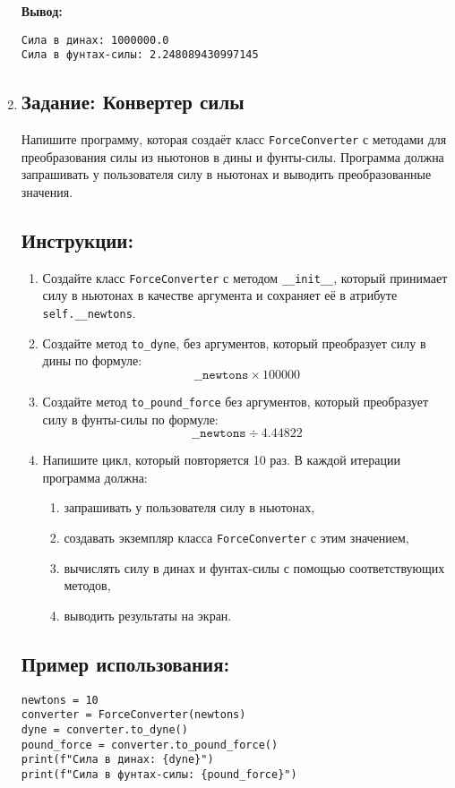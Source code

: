 \begin{enumerate}
\textbf{Вывод:}
\begin{verbatim}
Сила в динах: 1000000.0
Сила в фунтах-силы: 2.248089430997145
\end{verbatim}

\item 

\subsection*{Задание: Конвертер силы}
Напишите программу, которая создаёт класс \texttt{ForceConverter} с методами для преобразования силы
из ньютонов в дины и фунты-силы. Программа должна запрашивать у пользователя силу в ньютонах
и выводить преобразованные значения.

\subsection*{Инструкции:}
\begin{enumerate}
\item Создайте класс \texttt{ForceConverter} с методом
\texttt{\_\_init\_\_}, который принимает силу в ньютонах в
качестве аргумента и сохраняет её в атрибуте \texttt{self.\_\_newtons}.

\item Создайте метод \texttt{to\_dyne},
без аргументов, который преобразует силу в дины по формуле:
\[
\texttt{\_\_newtons} \times 100000
\]

\item Создайте метод \texttt{to\_pound\_force} без аргументов,
который преобразует силу в фунты-силы по формуле:
\[
\texttt{\_\_newtons} \div 4.44822
\]

\item Напишите цикл, который повторяется 10 раз. В каждой итерации программа должна:
\begin{enumerate}
\item запрашивать у пользователя силу в ньютонах,
\item создавать экземпляр класса \texttt{ForceConverter} с этим значением,
\item вычислять силу в динах и фунтах-силы с помощью соответствующих методов,
\item выводить результаты на экран.
\end{enumerate}
\end{enumerate}

\subsection*{Пример использования:}
\begin{verbatim}
newtons = 10
converter = ForceConverter(newtons)
dyne = converter.to_dyne()
pound_force = converter.to_pound_force()
print(f"Сила в динах: {dyne}")
print(f"Сила в фунтах-силы: {pound_force}")
\end{verbatim}


\end{enumerate}
